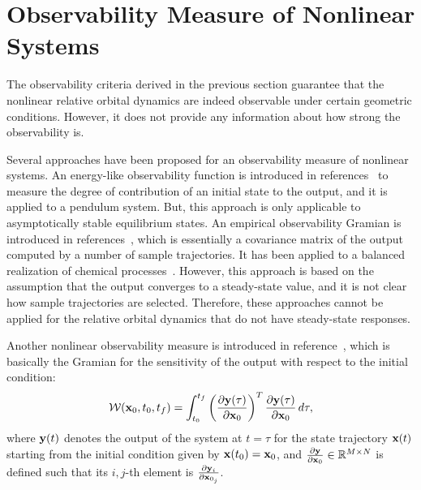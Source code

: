 

\section{Observability Measure of Nonlinear Systems}

The observability criteria derived in the previous section guarantee that the nonlinear relative orbital dynamics are indeed observable under certain geometric conditions. However, it does not provide any information about how strong the observability is. 

Several approaches have been proposed for an observability measure of nonlinear systems. 
An energy-like observability function is introduced in references~\cite{SchSCL93,Sch94,NewKriPICDC98} to measure the degree of contribution of an initial state to the output, and it is applied to a pendulum system. But, this approach is only applicable to asymptotically stable equilibrium states. An empirical observability Gramian is introduced in references~\cite{LalMarPIWC99,LalMarIJRNC02}, which is essentially a covariance matrix of the output computed by a number of sample trajectories.
It has been applied to a balanced realization of chemical processes~\cite{HahEdgJPC03,HahEdgCCE02}. However, this approach is based on the assumption that the output converges to a steady-state value, and it is not clear how sample trajectories are selected. Therefore, these approaches cannot be applied for the relative orbital dynamics that do not have steady-state responses. 

Another nonlinear observability measure is introduced in reference~\cite{KreIdePICDC09}, which is basically the Gramian for the sensitivity of the output with respect to the initial condition:
\begin{align}
\mathcal{W} (\mathbf{x}_0,t_0,t_f) = \int_{t_0}^{t_f} \left( \frac{\partial \mathbf{y}(\tau)}{\partial \mathbf{x}_0} \right)^T\frac{\partial \mathbf{y}(\tau)}{\partial \mathbf{x}_0}\,d\tau,\label{eqn:Wo_NL}
\end{align}
where $\mathbf{y}(t)$ denotes the output of the system at $t=\tau$ for the state trajectory $\mathbf{x}(t)$ starting from the initial condition given by $\mathbf{x}(t_0)=\mathbf{x}_0$, and $\frac{\partial \mathbf{y}}{\partial \mathbf{x}_0}\in\mathbb{R}^{M\times N}$ is defined such that its $i,j$-th element is $\frac{\partial \mathbf{y}_i}{\partial \mathbf{x}_{0_j}}$. 


